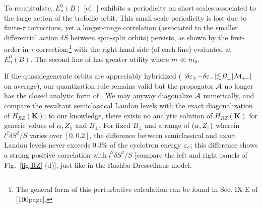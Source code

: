\documentclass[aps, prb, showpacs, twocolumn, notitlepage, superscriptaddress]{revtex4-1}
\begin{document}


To recapitulate, $E_n^0(B)$ [cf.\ ] exhibits a periodicity on short scales associated to the large action of the trefoille orbit. This small-scale periodicity is lost due to  finite-$\tau$ corrections, yet a longer-range correlation (associated to the smaller differential action $\delta S$ between spin-split orbits) persists, as shown by the first-order-in-$\tau$ correction:\footnote{The general form of this perturbative calculation can be found in Sec. IX-E of [100page].} 
with the right-hand side (of each line) evaluated at $E_n^0(B)$. The second line of  has greater utility where $m{\ll}m_0$. 



If the quasidegenerate orbits are appreciably hybridized ( $|\delta \varepsilon_+{-}\delta \varepsilon_-|{\lesssim}B_\perp|{\cal M}_{\scriptscriptstyle{+-}}|$ on average), our quantization rule  remains valid but the propagator ${\cal A}$ no longer has the closed analytic form of . We may anyway diagonalize ${\cal A}$ numerically, and compare the resultant semiclassical Landau levels with the exact diagonalization of $H_{RZ}(\boldsymbol{K})$; to our knowledge, there exists no analytic solution of $H_{RZ}(\boldsymbol{K})$ for generic values of $\alpha,Z_{\scriptscriptstyle{\parallel}}$ and $B_{\perp}$. For fixed  $B_{\perp}$ and a range of $(\alpha,Z_{\scriptscriptstyle{\parallel}})$ wherein  $l^2\delta S^2/S$ varies over $[0,0.2]$, the difference between semiclassical and exact Landau levels never exceeds  0.3\% of the cyclotron energy $\varepsilon_c$; this difference shows a strong positive correlation with $l^2\delta S^2/S$ [compare the left and right panels of Fig.\ \ref{fig:RZ} (d)], just like in the Rashba-Dresselhaus model. 
\end{document}
